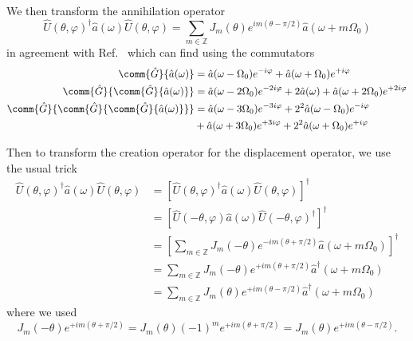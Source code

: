 We then transform the annihilation operator
\begin{equation}
	\hat{U}(\theta,\varphi)^\dagger
	\hat{a}(\omega)
	\hat{U}(\theta,\varphi)
	=
	\sum_{m\in\mathbb{Z}}
	J_m(\theta)
	e^{im(\theta-\pi/2)}
	\hat{a}(\omega+m\Omega_0)
\end{equation}
in agreement with Ref.~\cite[eq.~40]{Horoshko2018} which can find using the commutators
\begin{align}
	\comm{\hat{G}}{\hat{a}(\omega)}
	&=
	\hat{a}(\omega-\Omega_0)
	e^{-i\varphi}
	+
	\hat{a}(\omega+\Omega_0)
	e^{+i\varphi}
	\\
	\comm{\hat{G}}{\comm{\hat{G}}{\hat{a}(\omega)}}
	&=
	\hat{a}(\omega-2\Omega_0)
	e^{-2i\varphi}
	+
	2\hat{a}(\omega)
	+
	\hat{a}(\omega+2\Omega_0)
	e^{+2i\varphi}
	\\
	\comm{\hat{G}}{\comm{\hat{G}}{\comm{\hat{G}}{\hat{a}(\omega)}}}
	&=
	\hat{a}(\omega-3\Omega_0)
	e^{-3i\varphi}
	+
	2^2
	\hat{a}(\omega-\Omega_0)
	e^{-i\varphi}
	\\
	&+
	\hat{a}(\omega+3\Omega_0)
	e^{+3i\varphi}
	+
	2^2
	\hat{a}(\omega+\Omega_0)
	e^{+i\varphi}
\end{align}

Then to transform the creation operator for the displacement operator, we use the usual trick
\begin{equation}
	\begin{split}
		\hat{U}(\theta,\varphi)^\dagger
		\hat{a}(\omega)
		\hat{U}(\theta,\varphi)
		&=
		\left[
			\hat{U}(\theta,\varphi)^\dagger
			\hat{a}(\omega)
			\hat{U}(\theta,\varphi)	
		\right]^\dagger
		\\
		&=
		\left[
			\hat{U}(-\theta,\varphi)
			\hat{a}(\omega)
			\hat{U}(-\theta,\varphi)^\dagger	
		\right]^\dagger
		\\
		&=
		\left[
			\sum_{m\in\mathbb{Z}}
			J_m(-\theta)
			e^{-im(\theta+\pi/2)}
			\hat{a}(\omega+m\Omega_0)
		\right]^\dagger
		\\
		&=
		\sum_{m\in\mathbb{Z}}
		J_m(-\theta)
		e^{+im(\theta+\pi/2)}
		\hat{a}^\dagger(\omega+m\Omega_0)
		\\
		&=
		\sum_{m\in\mathbb{Z}}
		J_m(\theta)
		e^{+im(\theta-\pi/2)}
		\hat{a}^\dagger(\omega+m\Omega_0)
	\end{split}
\end{equation}
where we used
\begin{equation}
	J_m(-\theta)
	e^{+im(\theta+\pi/2)}
	=
	J_m(\theta)
	(-1)^m
	e^{+im(\theta+\pi/2)}
	=
	J_m(\theta)
	e^{+im(\theta-\pi/2)}
	.
\end{equation}

